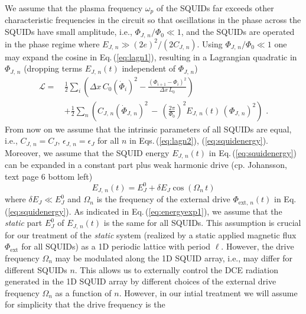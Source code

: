We assume that the plasma frequency $\omega_p$ of the SQUIDs far exceeds other characteristic frequencies 
in the circuit so that oscillations in the phase across the SQUIDs have small amplitude, i.e., 
$\Phi_{J,\,n} / \Phi_0 \ll 1$,
and the SQUIDs are operated in the phase regime where $E_{J,\,n} \gg (2e)^2 / (2C_{J,\,n})$. 
Using $\Phi_{J,\,n} / \Phi_0 \ll 1$ one may expand the cosine in Eq.\,(\ref{eq:lagn1}), 
resulting in a Lagrangian quadratic in $\Phi_{J,\,n}$ (dropping terms $E_{J,\,n}(t)$ 
independent of $\Phi_{J,\,n}$)
%
\begin{equation} \label{eq:lagn2}
\begin{split}
\mathcal{L} = \, & \frac{1}{2} \sum_i \left( \Delta x \, C_{0} \left(\dot{\Phi}_{i}\right)^{2} - 
\frac{\left(\Phi_{i+1}-\Phi_{i}\right)^{2}}{\Delta x \, L_{0}} \right)  \\[2mm]
& + \frac{1}{2} \sum_n \left( C_{J,\,n} \left(\dot{\Phi}_{J,\,n} \right)^{2} \, - \, 
 \left(\frac{2 \pi}{\Phi_0} \right)^2 E_{J,\,n}(t) \, \left( \Phi_{J,\,n} \right)^2 
\right) \, \, .
\end{split}
\end{equation}
%
From now on we assume that the intrinsic parameters of all SQUIDs are equal, i.e., 
$C_{J,\,n} = C_J$, $\epsilon_{J,\,n} = \epsilon_J$ for all $n$ in Eqs.\,(\ref{eq:lagn2}), (\ref{eq:squidenergy}).  
Moreover, we assume that the SQUID energy $E_{J,\,n}(t)$ in Eq.\,(\ref{eq:squidenergy}) 
can be expanded in a constant part plus weak harmonic drive 
(cp. Johansson, text page 6 bottom left)
%
\begin{equation} \label{eq:energyexp1}
E_{J,\,n}(t) = E_J^0 + \delta E_J \cos(\Omega_n \, t) 
\end{equation}
%
where $\delta E_J \ll E_J^0$ and $\Omega_n$ is the frequency of the external drive 
$\Phi_{\text{ext},\,n}(t)$ in Eq.\,(\ref{eq:squidenergy}).
As indicated in Eq.\,(\ref{eq:energyexp1}), we assume that the {\em static} part 
$E_J^0$ of $E_{J,\,n}(t)$ is the same for all SQUIDs. This assumption is crucial for our 
treatment of the {\em static} system (realized by a static applied magnetic flux $\Phi_{\text{ext}}$
for all SQUIDs) as a 1D periodic lattice with period $\ell$. However, the drive frequency 
$\Omega_n$ may be modulated along the 1D SQUID array, i.e., may differ for different SQUIDs $n$.   
This allows us to externally control the DCE radiation generated in the 1D SQUID array 
by different choices of the external drive frequency $\Omega_n$ as a function of $n$. 
However, in our intial treatment we will assume for simplicity that the drive frequency is the 
